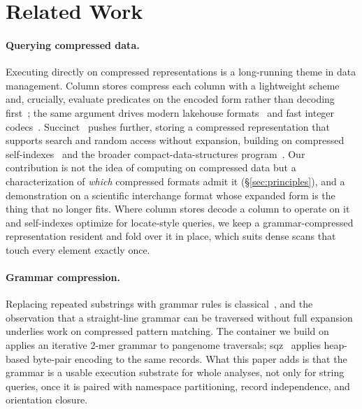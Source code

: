 \section{Related Work}
\label{sec:related}

\paragraph{Querying compressed data.}
Executing directly on compressed representations is a long-running theme in data
management. Column stores compress each column with a lightweight scheme and,
crucially, evaluate predicates on the encoded form rather than decoding
first~\cite{abadi2006integrating,boncz2005monetdb,zukowski2006super}; the same
argument drives modern lakehouse formats~\cite{melnik2010dremel,kuschewski2023btrblocks}
and fast integer codecs~\cite{lemire2015decoding}. Succinct~\cite{agarwal2015succinct}
pushes further, storing a compressed representation that supports search and random
access without expansion, building on compressed self-indexes~\cite{ferragina2000opportunistic,gagie2020fully}
and the broader compact-data-structures program~\cite{jacobson1989space,navarro2016compact}.
Our contribution is not the idea of computing on compressed data but a
characterization of \emph{which} compressed formats admit it
(\S\ref{sec:principles}), and a demonstration on a scientific interchange format
whose expanded form is the thing that no longer fits. Where column stores decode a
column to operate on it and self-indexes optimize for locate-style queries, we keep
a grammar-compressed representation resident and fold over it in place, which suits
dense scans that touch every element exactly once.

\paragraph{Grammar compression.}
Replacing repeated substrings with grammar rules is
classical~\cite{ziv1977universal,nevill1997identifying,larsson2000offline}, and the
observation that a straight-line grammar can be traversed without full expansion
underlies work on compressed pattern matching. The container we build
on~\cite{gfaz2026} applies an iterative 2-mer grammar to pangenome traversals;
sqz~\cite{heringer2025human} applies heap-based byte-pair encoding to the same
records. What this paper adds is that the grammar is a usable execution substrate
for whole analyses, not only for string queries, once it is paired with namespace
partitioning, record independence, and orientation closure.


